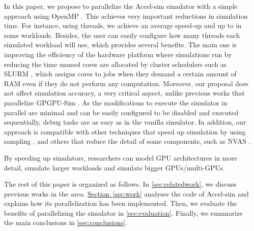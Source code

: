 \par
In this paper, we propose to parallelize the Accel-sim simulator with a simple approach using OpenMP \cite{openmp}. This achieves very important reductions in simulation time. For instance, using \summaryNumCores{} threads, we achieve an \summaryAvgSpeedup{} average speed-up and up to \summaryMaxSpeedup{} in some workloads. Besides, the user can easily configure how many threads each simulated workload will use, which provides several benefits. The main one is improving the efficiency of the hardware platform where simulations run by reducing the time unused cores are allocated by cluster schedulers such as SLURM \cite{slurm}, which assigns cores to jobs when they demand a certain amount of RAM even if they do not perform any computation. Moreover, our proposal does not affect simulation accuracy, a very critical aspect, unlike previous works that parallelize GPGPU-Sim \cite{parallelGPUSim1} \cite{parallelGPUSim2}. As the modifications to execute the simulator in parallel are minimal and can be easily configured to be disabled and executed sequentially, debug tasks are as easy as in the vanilla simulator. In addition, our approach is compatible with other techniques that speed up simulation by using sampling \cite{pcaKernelGpuSampling}, and others that reduce the detail of some components, such as NVAS \cite{nvas}.

\par
By speeding up simulators, researchers can model GPU architectures in more detail, simulate larger workloads and simulate bigger GPUs/multi-GPUs.

\par
The rest of this paper is organized as follows. In \autoref{sec:relatedwork}, we discuss previous works in the area. \hyperref[sec:work]{Section~\ref*{sec:work}} analyses the code of Accel-sim and explains how its parallelization has been implemented. Then, we evaluate the benefits of parallelizing the simulator in \autoref{sec:evaluation}. Finally, we summarize the main conclusions in \autoref{sec:conclusions}.